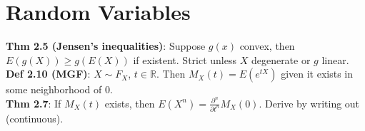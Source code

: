 \section{Random Variables}
\textbf{Thm 2.5 (Jensen's inequalities)}: Suppose $g(x)$ convex, then $E(g(X)) \geq g(E(X))$ if existent. Strict unless $X$ degenerate or $g$ linear.\\
\textbf{Def 2.10 (MGF)}: $X\sim F_X$, $t\in\mathbb{R}$. Then $M_X(t) = E(e^{tX})$ given it exists in some neighborhood of 0.\\
\textbf{Thm 2.7}: If $M_X(t)$ exists, then $E(X^n) = \frac{\partial^n}{\partial t^n}M_X(0)$. Derive by writing out (continuous).
